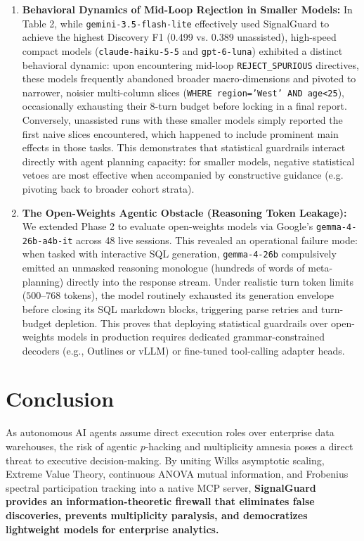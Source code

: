 \documentclass[11pt,a4paper]{article}
\begin{document}
\begin{enumerate}
    \item \textbf{Behavioral Dynamics of Mid-Loop Rejection in Smaller Models:} In Table 2, while \texttt{gemini-3.5-flash-lite} effectively used SignalGuard to achieve the highest Discovery F1 (0.499 vs. 0.389 unassisted), high-speed compact models (\texttt{claude-haiku-5-5} and \texttt{gpt-6-luna}) exhibited a distinct behavioral dynamic: upon encountering mid-loop \texttt{REJECT\_SPURIOUS} directives, these models frequently abandoned broader macro-dimensions and pivoted to narrower, noisier multi-column slices (\texttt{WHERE region='West' AND age<25}), occasionally exhausting their 8-turn budget before locking in a final report. Conversely, unassisted runs with these smaller models simply reported the first naive slices encountered, which happened to include prominent main effects in those tasks. This demonstrates that statistical guardrails interact directly with agent planning capacity: for smaller models, negative statistical vetoes are most effective when accompanied by constructive guidance (e.g. pivoting back to broader cohort strata).
    \item \textbf{The Open-Weights Agentic Obstacle (Reasoning Token Leakage):} We extended Phase 2 to evaluate open-weights models via Google's \texttt{gemma-4-26b-a4b-it} across 48 live sessions. This revealed an operational failure mode: when tasked with interactive SQL generation, \texttt{gemma-4-26b} compulsively emitted an unmasked reasoning monologue (hundreds of words of meta-planning) directly into the response stream. Under realistic turn token limits ($500\text{--}768$ tokens), the model routinely exhausted its generation envelope before closing its SQL markdown blocks, triggering parse retries and turn-budget depletion. This proves that deploying statistical guardrails over open-weights models in production requires dedicated grammar-constrained decoders (e.g., Outlines or vLLM) or fine-tuned tool-calling adapter heads.
\end{enumerate}

\section{Conclusion}
As autonomous AI agents assume direct execution roles over enterprise data warehouses, the risk of agentic $p$-hacking and multiplicity amnesia poses a direct threat to executive decision-making. By uniting Wilks asymptotic scaling, Extreme Value Theory, continuous ANOVA mutual information, and Frobenius spectral participation tracking into a native MCP server, \textbf{SignalGuard provides an information-theoretic firewall that eliminates false discoveries, prevents multiplicity paralysis, and democratizes lightweight models for enterprise analytics.}



\end{document}

